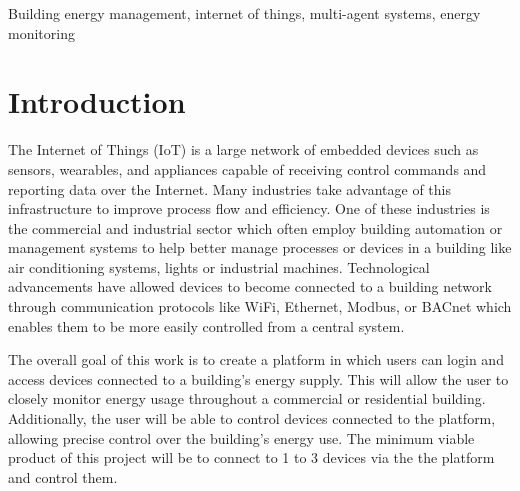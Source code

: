 \documentclass[conference]{IEEEtran}
\begin{document}
\begin{IEEEkeywords}
  Building energy management, internet of things, multi-agent systems, energy monitoring  
\end{IEEEkeywords}

\section{Introduction}
\label{sec:introduction}

The Internet of Things (IoT) is a large network of embedded devices such as sensors, wearables, and appliances capable of receiving control commands and reporting
data over the Internet. Many industries take advantage of this infrastructure to
improve process flow and efficiency. One of these industries is the commercial
and industrial sector which often employ building automation or management
systems to help better manage processes or devices in a building like air
conditioning systems, lights or industrial machines. Technological advancements
have allowed devices to become connected to a building network through
communication protocols like WiFi, Ethernet, Modbus, or BACnet which enables
them to be more easily controlled from a central system.


The overall goal of this work is to create a platform in which users can login and access devices
connected to a building's energy supply. This will allow the user to closely
monitor energy usage throughout a commercial or residential building.
Additionally, the user will be able to control devices connected to the
platform, allowing precise control over the building's energy use. The minimum
viable product of this project will be to connect to 1 to 3 devices via the the
platform and control them.

\end{document}
